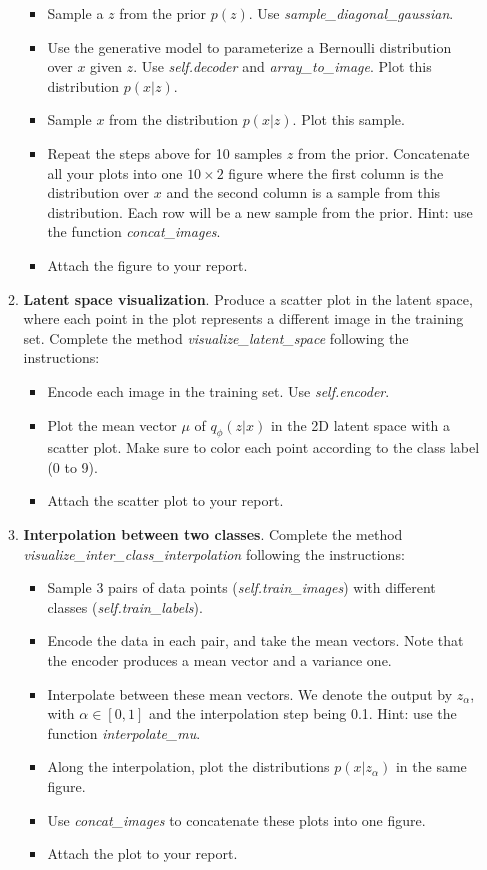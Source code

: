 \begin{Q}
\begin{enumerate}
\begin{enumerate}
			\begin{itemize}
				\item Sample a $z$ from the prior $p(z)$. Use \textit{sample\_diagonal\_gaussian}.
				\item Use the generative model to parameterize a Bernoulli distribution over $x$ given $z$. Use \textit{self.decoder} and \textit{array\_to\_image}. Plot this distribution $p(x|z)$.
				\item Sample $x$ from the distribution $p(x|z)$. Plot this sample.
				\item Repeat the steps above for 10 samples $z$ from the prior. Concatenate all your plots into one $10\times2$ figure where the first column is the distribution over $x$ and the second column is a sample from this distribution. Each row will be a new sample from the prior. Hint: use the function \textit{concat\_images}.
				\item Attach the figure to your report.
			\end{itemize}
			\item \textbf{Latent space visualization}. Produce a scatter plot in the latent space, where each point in the plot represents a different image in the training set. Complete the method \textit{visualize\_latent\_space} following the instructions:
			\begin{itemize}
				\item  Encode each image in the training set. Use \textit{self.encoder}.
				\item Plot the mean vector $\mu$ of $q_{\phi}(z|x)$ in the 2D latent space with a scatter plot. Make sure to color each point according to the class label (0 to 9). 
				\item Attach the scatter plot to your report.
			\end{itemize}
			\item  \textbf{Interpolation between two classes}. Complete the method \textit{visualize\_inter\_class\_interpolation} following the instructions:
			\begin{itemize}
				\item  Sample 3 pairs of data points (\textit{self.train\_images}) with different classes (\textit{self.train\_labels}).
				\item  Encode the data in each pair, and take the mean vectors. Note that the encoder produces a mean vector and a variance one.
				\item  Interpolate between these mean vectors. We denote the output by $z_{\alpha}$, with $\alpha \in [0,1]$ and the interpolation step being 0.1. Hint:  use the function \textit{interpolate\_mu}.
				\item Along the interpolation, plot the distributions $p(x|z_{\alpha})$ in the same figure.
				\item Use \textit{concat\_images} to concatenate these plots into one figure.
				\item Attach the plot to your report.
			\end{itemize}
		\end{enumerate}
		

\end{enumerate}
\end{Q}
